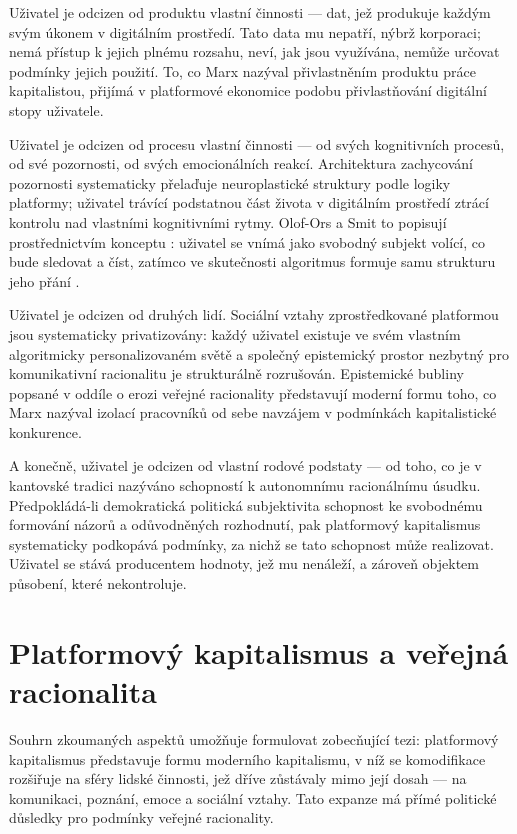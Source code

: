 Uživatel je odcizen od produktu vlastní činnosti — dat, jež produkuje každým svým úkonem v digitálním prostředí. Tato data mu nepatří, nýbrž korporaci; nemá přístup k jejich plnému rozsahu, neví, jak jsou využívána, nemůže určovat podmínky jejich použití.
To, co Marx nazýval přivlastněním produktu práce kapitalistou, přijímá v platformové ekonomice podobu přivlastňování digitální stopy uživatele.

Uživatel je odcizen od procesu vlastní činnosti — od svých kognitivních procesů, od své pozornosti, od svých emocionálních reakcí. Architektura zachycování pozornosti systematicky přelaďuje neuroplastické struktury podle logiky platformy; uživatel trávící podstatnou část života v digitálním prostředí ztrácí kontrolu nad vlastními kognitivními rytmy. Olof-Ors a Smit to popisují prostřednictvím konceptu : uživatel se vnímá jako svobodný subjekt volící, co bude sledovat a číst, zatímco ve skutečnosti algoritmus formuje samu strukturu jeho přání \parencite{OlofOrsSmit25}.

Uživatel je odcizen od druhých lidí. Sociální vztahy zprostředkované platformou jsou systematicky privatizovány: každý uživatel existuje ve svém vlastním algoritmicky personalizovaném světě a společný epistemický prostor nezbytný pro komunikativní racionalitu je strukturálně rozrušován.
Epistemické bubliny popsané v oddíle o erozi veřejné racionality představují moderní formu toho, co Marx nazýval izolací pracovníků od sebe navzájem v podmínkách kapitalistické konkurence.

A konečně, uživatel je odcizen od vlastní rodové podstaty — od toho, co je v kantovské tradici nazýváno schopností k autonomnímu racionálnímu úsudku.
Předpokládá-li demokratická politická subjektivita schopnost ke svobodnému formování názorů a odůvodněných rozhodnutí, pak platformový kapitalismus systematicky podkopává podmínky, za nichž se tato schopnost může realizovat.
Uživatel se stává producentem hodnoty, jež mu nenáleží, a zároveň objektem působení, které nekontroluje.

\section{Platformový kapitalismus a veřejná racionalita}

Souhrn zkoumaných aspektů umožňuje formulovat zobecňující tezi: platformový kapitalismus představuje formu moderního kapitalismu, v níž se komodifikace rozšiřuje na sféry lidské činnosti, jež dříve zůstávaly mimo její dosah — na komunikaci, poznání, emoce a sociální vztahy.
Tato expanze má přímé politické důsledky pro podmínky veřejné racionality.

